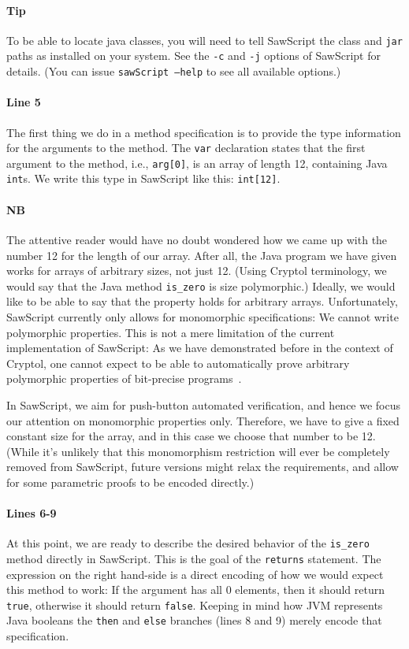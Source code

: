 \documentclass[12pt]{galois-whitepaper}
\newcommand{\sawScript}{{\sc SawScript}\xspace}
\begin{document}
\paragraph{Tip} To be able to locate java classes, you will need to tell \sawScript the class and {\tt jar} paths as installed
on your system. See the {\tt -c} and {\tt -j} options of \sawScript for details. (You can issue {\tt sawScript --help} to see
all available options.)

\paragraph{Line 5} The first thing we do in a method specification is to provide the type information for the arguments to the method.
The {\tt var} declaration states that the first argument to the method, i.e., {\tt arg[0]}, is an array of length 12, containing
Java {\tt int}s. We write this type in \sawScript like this: {\tt int[12]}.

\paragraph{NB} The attentive reader would have no doubt wondered how we came up with the number 12 for the length of our array. After
all, the Java program we have given works for arrays of arbitrary sizes, not just 12. (Using Cryptol terminology, we would say that
the Java method {\tt is\_zero} is size polymorphic.) Ideally, we would like to be able to say that the property holds for arbitrary
arrays. Unfortunately, \sawScript currently only allows for monomorphic specifications: We cannot write polymorphic properties. This
is not a mere limitation of the current implementation of \sawScript: As we have demonstrated before in the context of Cryptol, one cannot
expect to be able to automatically prove arbitrary polymorphic properties of bit-precise programs~\cite{erkok-matthews-cryptolEqChecking-09}.

In \sawScript, we
aim for push-button automated verification, and hence we focus our attention on monomorphic properties only. Therefore, we have to give
a fixed constant size for the array, and in this case we choose that number to be 12. (While it's unlikely that this monomorphism restriction
will ever be completely removed from \sawScript, future versions might relax the requirements, and allow for some parametric proofs to be encoded directly.)

\paragraph{Lines 6-9} At this point, we are ready to describe the desired behavior of the {\tt is\_zero} method directly in \sawScript. This is the goal
of the {\tt returns} statement. The expression on the right hand-side is a direct encoding of how we would expect this method to work: If the argument
has all 0 elements, then it should return {\tt true}, otherwise it should return {\tt false}. Keeping in mind how JVM represents Java booleans
the {\tt then} and {\tt else} branches (lines 8 and 9) merely encode that specification.
\end{document}
